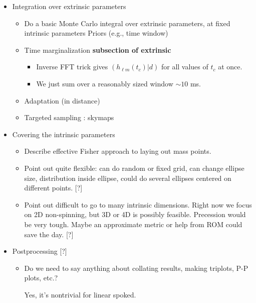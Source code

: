 \documentclass[twocolumn,prd,nofootinbib]{revtex4}
\begin{document}
\begin{widetext}
\begin{itemize}
\begin{itemize}
		
	\item Integration over extrinsic parameters
		\begin{itemize}
		\item Do a basic Monte Carlo integral over  extrinsic parameters, at fixed intrinsic parameters
                        Priors (e.g., time window)
		\end{itemize}
                \begin{itemize}
  	         \item Time marginalization  \textbf{subsection of extrinsic} 
		  \begin{itemize}
		  \item Inverse FFT trick gives $(h_{\ell m}(t_c) | d)$ for all values of $t_c$ at once.
		  \item We just sum over a reasonably sized window $\sim 10$ ms. 
		  \end{itemize}
                 \item Adaptation (in distance)
                 \item Targeted sampling : skymaps
                \end{itemize}

	\item Covering the intrinsic parameters
		\begin{itemize}
		\item Describe effective Fisher approach to laying out mass points.
		\item Point out quite flexible: can do random or fixed grid, can change ellipse size, distribution inside ellipse,
			could do several ellipses centered on different points. [?]
		\item Point out difficult to go to many intrinsic dimensions. Right now we focus on 2D non-spinning, 
			but 3D or 4D is possibly feasible.
			Precession would be very tough. 
			Maybe an approximate metric or help from ROM could save the day. [?]
		\end{itemize}
		
	
	\item Postprocessing [?]
		\begin{itemize}
		\item Do we need to say anything about collating results, making triplots, P-P plots, etc.?

                  Yes, it's nontrivial for linear spoked.
		\end{itemize}


\end{itemize}
\end{itemize}
\end{widetext}
\end{document}
